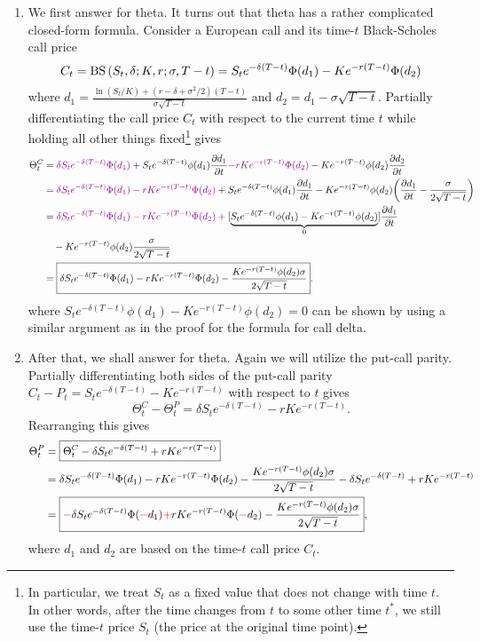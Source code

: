 \begin{enumerate}
\item \label{it:call-theta-fmla} We first answer  for
theta. It turns out that theta has a rather complicated closed-form formula.
Consider a European call and its time-\(t\) Black-Scholes call price
\[
C_t=\operatorname{BS}\qty(S_t,\delta;K,r;\sigma,T-t)=S_te^{-\delta(T-t)}\Phi(d_1)-Ke^{-r(T-t)}\Phi(d_2)
\]
where \(\displaystyle
d_1=\frac{\ln(S_t/K)+(r-\delta+\sigma^2/2)(T-t)}{\sigma\sqrt{T-t}}\) and
\(d_2=d_1-\sigma\sqrt{T-t}\). Partially differentiating the call price \(C_t\)
with respect to the current time \(t\) while holding all other things
fixed\footnote{In particular, we treat \(S_t\) as a fixed value that does not
change with time \(t\). In other words, after the time changes from \(t\) to
some other time \(t^*\), we still use the time-\(t\) price \(S_t\) (the price
at the original time point).} gives
\begin{align*}
\Theta_t^C&=\vc{\delta S_te^{-\delta(T-t)}\Phi(d_1)}+S_te^{-\delta(T-t)}\phi(d_1)\pdv{d_1}{t}
\vc{-rKe^{-r(T-t)}\Phi(d_2)}-Ke^{-r(T-t)}\phi(d_2)\pdv{d_2}{t} \\
&=\vc{\delta S_te^{-\delta(T-t)}\Phi(d_1)-rKe^{-r(T-t)}\Phi(d_2)}
+S_te^{-\delta(T-t)}\phi(d_1)\pdv{d_1}{t}
-Ke^{-r(T-t)}\phi(d_2)\qty(\pdv{d_1}{t}-\frac{\sigma}{2\sqrt{T-t}}) \\
&=\vc{\delta S_te^{-\delta(T-t)}\Phi(d_1)-rKe^{-r(T-t)}\Phi(d_2)}
+[\underbrace{S_te^{-\delta(T-t)}\phi(d_1)-Ke^{-r(T-t)}\phi(d_2)}_{0}]\pdv{d_1}{t} \\
&\quad-Ke^{-r(T-t)}\phi(d_2)\frac{\sigma}{2\sqrt{T-t}} \\
&=\boxed{\delta S_te^{-\delta(T-t)}\Phi(d_1)-rKe^{-r(T-t)}\Phi(d_2)
-\frac{Ke^{-r(T-t)}\phi(d_2)\sigma}{2\sqrt{T-t}}}.
\end{align*}
where \(S_te^{-\delta(T-t)}\phi(d_1)-Ke^{-r(T-t)}\phi(d_2)=0\) can be shown by
using a similar argument as in the proof for the formula for call delta.

\item \label{it:call-put-theta-relate} After that, we shall answer
\label{it:call-put-greek} for theta. Again we will utilize the put-call parity.
Partially differentiating both sides of the put-call parity
\(C_t-P_t=S_te^{-\delta(T-t)}-Ke^{-r(T-t)}\) with respect to \(t\) gives
\[
\Theta_t^{C}-\Theta_t^{P}=\delta S_te^{-\delta(T-t)}-rKe^{-r(T-t)}.
\]
Rearranging this gives
\begin{align*}
\Theta_t^P&=\boxed{\Theta_t^C -\delta S_te^{-\delta(T-t)}+rKe^{-r(T-t)}} \\
&=\delta S_te^{-\delta(T-t)}\Phi(d_1)-rKe^{-r(T-t)}\Phi(d_2)
-\frac{Ke^{-r(T-t)}\phi(d_2)\sigma}{2\sqrt{T-t}}
-\delta S_te^{-\delta(T-t)}+rKe^{-r(T-t)} \\
&=\boxed{{\color{red}-}\delta S_te^{-\delta(T-t)}\Phi({\color{red}-}d_1){\color{red}+}rKe^{-r(T-t)}\Phi({\color{red}-}d_2)
-\frac{Ke^{-r(T-t)}\phi(d_2)\sigma}{2\sqrt{T-t}}},
\end{align*}
where \(d_1\) and \(d_2\) are based on the time-\(t\) call price \(C_t\).


\end{enumerate}
